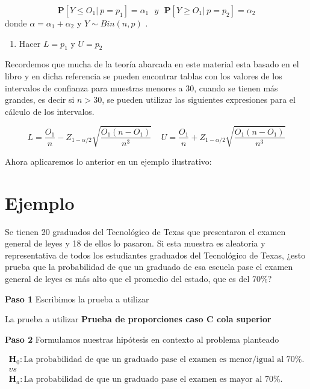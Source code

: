\documentclass[
  a4paper,
  oneside,
  openany]{book}
\providecommand{\tightlist}{%
  \setlength{\itemsep}{0pt}\setlength{\parskip}{0pt}}
\begin{document}
\[\mathbf{P}[Y\leq O_{1}| \ p=p_{1}]= \alpha_{1} \ \ \ y \ \ \ \mathbf{P}[Y\geq O_{1}| \ p=p_{2}]= \alpha_{2} \]
donde \(\alpha=\alpha_{1}+\alpha_{2}\) y \(Y \sim Bin (n,p)\) .

\begin{enumerate}
\def\labelenumi{\arabic{enumi})}
\setcounter{enumi}{2}
\tightlist
\item
  Hacer \(L= p_{1}\) y \(U=p_{2}\)
\end{enumerate}

Recordemos que mucha de la teoría abarcada en este material esta basado en el libro \citet{conover1998practical} y en dicha referencia se pueden encontrar tablas con los valores de los intervalos de confianza para muestras menores a 30, cuando se tienen más grandes, es decir si \(n>30\), se pueden utilizar las siguientes expresiones para el cálculo de los intervalos.

\[L=\frac{O_{1}}{n}-Z_{1-\alpha/2}\sqrt{\frac{O_{1}(n-O_{1})}{n^3}} \ \ \ \ \  U=\frac{O_{1}}{n}+Z_{1-\alpha/2}\sqrt{\frac{O_{1}(n-O_{1})}{n^3}}\]

Ahora aplicaremos lo anterior en un ejemplo ilustrativo:

\hypertarget{ejemplo}{%
\section{Ejemplo}\label{ejemplo}}

Se tienen 20 graduados del Tecnológico de Texas que presentaron el examen general de leyes y 18 de ellos lo pasaron. Si esta muestra es aleatoria y representativa de todos los estudiantes graduados del Tecnológico de Texas,
¿esto prueba que la probabilidad de que un graduado de esa escuela pase el examen general de leyes es más alto que el promedio del estado, que es del 70\%?

\textbf{Paso 1} Escribimos la prueba a utilizar

La prueba a utilizar \textbf{Prueba de proporciones caso C cola superior}

\textbf{Paso 2} Formulamos nuestras hipótesis en contexto al problema planteado

\[
\begin{array}{c}
\textbf{H}_{0}: \mbox{La probabilidad de que un graduado pase el examen es menor/igual al } 70\%.\\
vs\\
\textbf{H}_{a}: \mbox{La probabilidad de que un graduado pase el examen es mayor al }70\%.
\end{array}
\]
\end{document}
